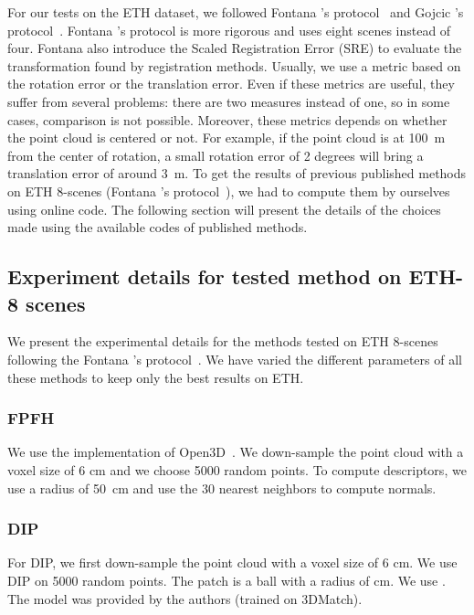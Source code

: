 \documentclass[10pt,twocolumn,letterpaper]{article}
\begin{document}
For our tests on the ETH dataset, we followed Fontana \etal's protocol~\cite{fontana2020benchmark} and Gojcic \etal's protocol~\cite{gojcic2018perfect}. Fontana \etal's protocol is more rigorous and uses eight scenes instead of four. Fontana \etal also introduce the Scaled Registration Error (SRE) to evaluate the transformation found by registration methods. Usually, we use a metric based on the rotation error or the translation error. Even if these metrics are useful, they suffer from several problems: there are two measures instead of one, so in some cases, comparison is not possible. Moreover, these metrics depends on whether the point cloud is centered or not. For example, if the point cloud is at 100~m from the center of rotation, a small rotation error of 2 degrees will bring a translation error of around 3~m.
To get the results of previous published methods on ETH 8-scenes (Fontana \etal's protocol~\cite{fontana2020benchmark}), we had to compute them by ourselves using online code. The following section will present the details of the choices made using the available codes of published methods.


\subsection{Experiment details for tested method on ETH-8 scenes}

We present the experimental details for the methods tested on ETH 8-scenes following the Fontana \etal's protocol~\cite{fontana2020benchmark}. We have varied the different parameters of all these methods to keep only the best results on ETH.



\subsubsection{FPFH~\cite{rusu_fast_2009}}
We use the implementation of Open3D~\cite{Zhou2018}. 
We down-sample the point cloud with a voxel size of 6 cm and we choose 5000 random points. To compute descriptors, we use a radius of 50~cm and use the 30 nearest neighbors to compute normals.

\subsubsection{DIP~\cite{Poiesi2021}}
For DIP, we first down-sample the point cloud with a voxel size of 6 cm. We use DIP on 5000 random points. The patch is a ball with a radius of  cm. We use . The model was provided by the authors (trained on 3DMatch).
\end{document}
